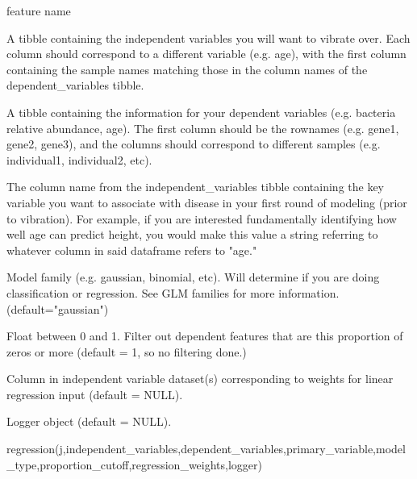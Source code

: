 \documentclass[a4paper]{book}
\begin{document}
\begin{Arguments}
\begin{ldescription}
\item[\code{j}] feature name

\item[\code{independent\_variables}] A tibble containing the independent variables you will want to vibrate over. Each column should correspond to a different variable (e.g. age), with the first column containing the sample names matching those in the column names of the dependent\_variables tibble.

\item[\code{dependent\_variables}] A tibble containing the information for your dependent variables (e.g. bacteria relative abundance, age). The first column should be the rownames (e.g. gene1, gene2, gene3), and the columns should correspond to different samples (e.g. individual1, individual2, etc).

\item[\code{primary\_variable}] The column name from the independent\_variables tibble containing the key variable you want to associate with disease in your first round of modeling (prior to vibration). For example, if you are interested fundamentally identifying how well age can predict height, you would make this value a string referring to whatever column in said dataframe refers to "age."

\item[\code{model\_type}] Model family (e.g. gaussian, binomial, etc). Will determine if you are doing classification or regression. See GLM families for more information. (default="gaussian")

\item[\code{proportion\_cutoff}] Float between 0 and 1. Filter out dependent features that are this proportion of zeros or more (default = 1, so no filtering done.)

\item[\code{regression\_weights}] Column in independent variable dataset(s) corresponding to weights  for linear regression input (default = NULL).

\item[\code{logger}] Logger object (default = NULL).
\end{ldescription}
\end{Arguments}
%
\begin{Examples}
\begin{ExampleCode}
regression(j,independent_variables,dependent_variables,primary_variable,model_type,proportion_cutoff,regression_weights,logger)
\end{ExampleCode}
\end{Examples}
\end{document}
